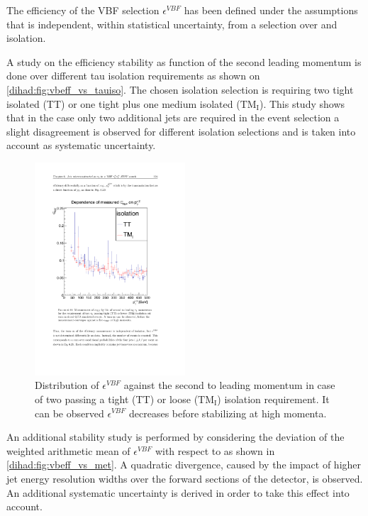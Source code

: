 The efficiency of the VBF selection $\epsilon^{VBF}$ has been defined under the assumptions that is independent, within statistical uncertainty, from a selection over \met and \hadtau isolation.
 
 A study on the efficiency stability as function of the second leading \hadtau momentum is done over different tau isolation requirements as shown on \autoref{dihad:fig:vbeff_vs_tauiso}. The chosen \hadtau isolation selection is requiring two tight isolated \hadtau (TT) or one tight plus one medium isolated \hadtau ($\text{TM}_{\text{I}}$). This study shows that in the case only two additional jets are required in the event selection a slight disagreement is observed for different isolation selections and is taken into account as systematic uncertainty.

 \begin{figure}[!h]
	\centering
	\includegraphics[width=0.5\textwidth]{analysis/pics/vbeff_vs_tauiso.pdf}
	\caption{Distribution of $\epsilon^{VBF}$ against the second to leading \hadtau momentum in case of two \hadtau passing a tight (TT) or loose ($\text{TM}_{\text{I}}$) isolation requirement. It can be observed $\epsilon^{VBF}$ decreases before stabilizing at high momenta.}
	\label{dihad:fig:vbeff_vs_tauiso}
\end{figure}

An additional stability study is performed by considering the deviation of the weighted arithmetic mean of $\epsilon^{VBF}$ with respect to \met as shown in \autoref{dihad:fig:vbeff_vs_met}. A quadratic divergence, caused by the impact of higher jet energy resolution widths over the forward sections of the detector, is observed. An additional systematic uncertainty is derived in order to take this effect into account.

